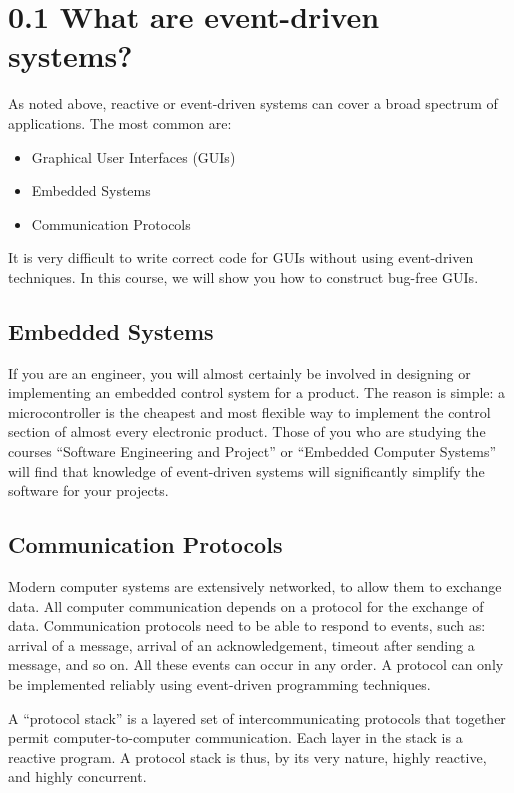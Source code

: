 \documentclass{article}
\begin{document}
\section*{0.1 What are event-driven systems?}

As noted above, reactive or event-driven systems can cover a broad spectrum of applications. The most common are:
\begin{itemize}
\item Graphical User Interfaces (GUIs)
\item Embedded Systems
\item Communication Protocols
\end{itemize}

It is very difficult to write correct code for GUIs without using event-driven techniques. In this course, we will show you how to construct bug-free GUIs.

\subsection*{Embedded Systems}

If you are an engineer, you will almost certainly be involved in designing or implementing an embedded control system for a product. The reason is simple: a microcontroller is the cheapest and most flexible way to implement the control section of almost every electronic product. Those of you who are studying the courses “Software Engineering and Project” or “Embedded Computer Systems” will find that knowledge of event-driven systems will significantly simplify the software for your projects.

\subsection*{Communication Protocols}

Modern computer systems are extensively networked, to allow them to exchange data. All computer communication depends on a protocol for the exchange of data. Communication protocols need to be able to respond to events, such as: arrival of a message, arrival of an acknowledgement, timeout after sending a message, and so on. All these events can occur in any order. A protocol can only be implemented reliably using event-driven programming techniques.

A “protocol stack” is a layered set of intercommunicating protocols that together permit computer-to-computer communication. Each layer in the stack is a reactive program. A protocol stack is thus, by its very nature, highly reactive, and highly concurrent.
\end{document}

